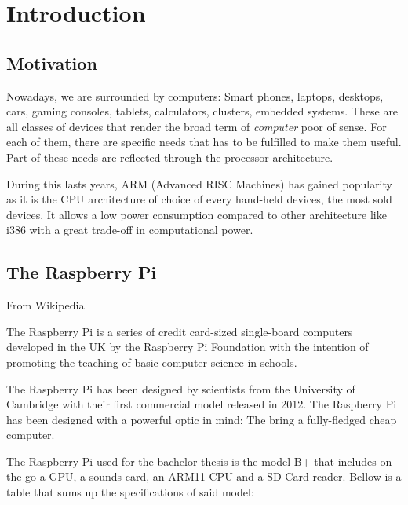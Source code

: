 \chapter{Introduction}

\section{Motivation}

Nowadays, we are surrounded by computers: Smart phones, laptops, desktops, cars, gaming consoles, tablets, calculators, clusters, embedded systems. These are all classes of devices that render the broad term of \textit{computer} poor of sense. For each of them, there are specific needs that has to be fulfilled to make them useful. Part of these needs are reflected through the processor architecture.

During this lasts years, ARM (Advanced RISC Machines) has gained popularity as it is the CPU architecture of choice of every hand-held devices, the most sold devices\cite{gartner_mobile_grow}. It allows a low power consumption compared to other architecture like i386 with a great trade-off in computational power.


\section{The Raspberry Pi}

From Wikipedia\cite{wikipedia_raspberry_pi}

\begin{displayquote}
The Raspberry Pi is a series of credit card-sized single-board computers developed in the UK by the Raspberry Pi Foundation with the intention of promoting the teaching of basic computer science in schools.
\end{displayquote}

The Raspberry Pi has been designed by scientists from the University of Cambridge with their first commercial model released in 2012. The Raspberry Pi has been designed with a powerful optic in mind: The bring a fully-fledged cheap computer.

The Raspberry Pi used for the bachelor thesis is the model B+ that includes on-the-go a GPU, a sounds card, an ARM11 CPU and a SD Card reader. Bellow is a table that sums up the specifications of said model:

